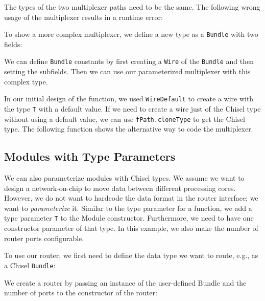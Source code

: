 \documentclass[%
    10pt,
    headinclude, footinclude=false,
    openright, %
    notitlepage,
    cleardoublepage=empty,
    headsepline,
    numbers=noenddot,
    bibliography=totoc, index=totoc,
    ]{scrbook}
\newcommand{\code}[1]{{\lstinline[basicstyle=\small\ttfamily]{#1}}}
\begin{document}

\noindent The types of the two multiplexer paths need to be the same.
The following wrong usage of the multiplexer results in a runtime error:


\noindent To show a more complex multiplexer, we define a new type as a \code{Bundle} with two fields:


\noindent We can define \code{Bundle} constants by first creating
a \code{Wire} of the \code{Bundle} and then setting the subfields.
Then we can use our parameterized multiplexer with this complex type.


In our initial design of the function, we used \code{WireDefault}
to create a wire with the type \code{T} with a default value.
If we need to create a wire just of the Chisel type without using a default
value, we can use \code{fPath.cloneType} to get the Chisel type.
The following function shows the alternative way to code the multiplexer.


\subsection{Modules with Type Parameters}

We can also parameterize modules with Chisel types.
We assume we want to design a network-on-chip to move data between
different processing cores. However, we do not want to hardcode the
data format in the router interface; we want to \emph{parameterize} it.
Similar to the type parameter for a function, we add a type parameter \code{T}
to the Module constructor. Furthermore, we need to have one constructor
parameter of that type. In this example, we also make the number
of router ports configurable.


\noindent To use our router, we first need to define the data type we want to route, e.g.,
as a Chisel \code{Bundle}:


\noindent We create a router by passing an instance of the user-defined Bundle and
the number of ports to the constructor of the router:
\end{document}
